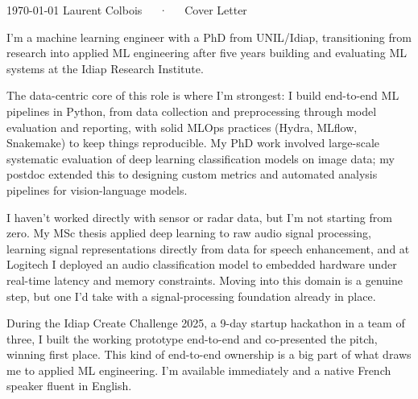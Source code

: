 \documentclass[11pt, a4paper]{awesome-cv}
\begin{document}
\makecvheader[R]

\makecvfooter
  {\today}
  {Laurent Colbois~~~·~~~Cover Letter}
  {}

\makelettertitle

\begin{cvletter}
I'm a machine learning engineer with a PhD from UNIL/Idiap, transitioning from research into applied ML engineering after five years building and evaluating ML systems at the Idiap Research Institute.

The data-centric core of this role is where I'm strongest: I build end-to-end ML pipelines in Python, from data collection and preprocessing through model evaluation and reporting, with solid MLOps practices (Hydra, MLflow, Snakemake) to keep things reproducible. My PhD work involved large-scale systematic evaluation of deep learning classification models on image data; my postdoc extended this to designing custom metrics and automated analysis pipelines for vision-language models.

I haven't worked directly with sensor or radar data, but I'm not starting from zero. My MSc thesis applied deep learning to raw audio signal processing, learning signal representations directly from data for speech enhancement, and at Logitech I deployed an audio classification model to embedded hardware under real-time latency and memory constraints. Moving into this domain is a genuine step, but one I'd take with a signal-processing foundation already in place.

During the Idiap Create Challenge 2025, a 9-day startup hackathon in a team of three, I built the working prototype end-to-end and co-presented the pitch, winning first place. This kind of end-to-end ownership is a big part of what draws me to applied ML engineering. I'm available immediately and a native French speaker fluent in English.


\end{cvletter}


\makeletterclosing
\end{document}
